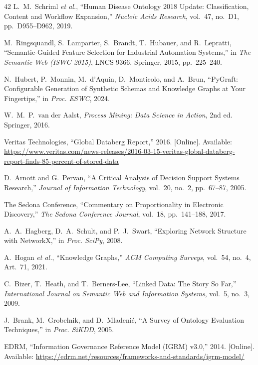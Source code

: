 \documentclass{ieeeaccess}
\begin{document}
\begin{thebibliography}{42}
L.~M.~Schriml \textit{et al.}, ``Human Disease Ontology 2018 Update: Classification, Content and Workflow Expansion,'' \textit{Nucleic Acids Research}, vol.~47, no.~D1, pp.~D955--D962, 2019.

M.~Ringsquandl, S.~Lamparter, S.~Brandt, T.~Hubauer, and R.~Lepratti, ``Semantic-Guided Feature Selection for Industrial Automation Systems,'' in \textit{The Semantic Web (ISWC 2015)}, LNCS 9366, Springer, 2015, pp.~225--240.

N.~Hubert, P.~Monnin, M.~d'Aquin, D.~Monticolo, and A.~Brun, ``PyGraft: Configurable Generation of Synthetic Schemas and Knowledge Graphs at Your Fingertips,'' in \textit{Proc. ESWC}, 2024.

W.~M.~P.~van der Aalst, \textit{Process Mining: Data Science in Action}, 2nd ed. Springer, 2016.

Veritas Technologies, ``Global Databerg Report,'' 2016. [Online]. Available: \url{https://www.veritas.com/news-releases/2016-03-15-veritas-global-databerg-report-finds-85-percent-of-stored-data}

D.~Arnott and G.~Pervan, ``A Critical Analysis of Decision Support Systems Research,'' \textit{Journal of Information Technology}, vol.~20, no.~2, pp.~67--87, 2005.

The Sedona Conference, ``Commentary on Proportionality in Electronic Discovery,'' \textit{The Sedona Conference Journal}, vol.~18, pp.~141--188, 2017.

A.~A.~Hagberg, D.~A.~Schult, and P.~J.~Swart, ``Exploring Network Structure with NetworkX,'' in \textit{Proc. SciPy}, 2008.

A.~Hogan \textit{et al.}, ``Knowledge Graphs,'' \textit{ACM Computing Surveys}, vol.~54, no.~4, Art.~71, 2021.

C.~Bizer, T.~Heath, and T.~Berners-Lee, ``Linked Data: The Story So Far,'' \textit{International Journal on Semantic Web and Information Systems}, vol.~5, no.~3, 2009.

J.~Brank, M.~Grobelnik, and D.~Mladeni\'{c}, ``A Survey of Ontology Evaluation Techniques,'' in \textit{Proc. SiKDD}, 2005.

EDRM, ``Information Governance Reference Model (IGRM) v3.0,'' 2014. [Online]. Available: \url{https://edrm.net/resources/frameworks-and-standards/igrm-model/}


\end{thebibliography}
\end{document}
